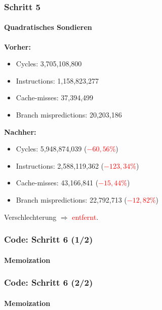 \documentclass{beamer}
\newcommand{\fail}[1]{\textcolor{red}{#1}}
\begin{document}
  \begin{frame}
  	\frametitle{Schritt 5}
  	\framesubtitle{Quadratisches Sondieren}
  	\textbf{Vorher:}
		\begin{itemize}
			\item Cycles: 3,705,108,800 \\
			\item Instructions: 1,158,823,277\\
			\item Cache-misses: 37,394,499\\
			\item Branch mispredictions: 20,203,186\\
		\end{itemize}

		\textbf{Nachher:}
		\begin{itemize}
			\item Cycles: 5,948,874,039 (\fail{$- 60,56 \%$})\\
			\item Instructions: 2,588,119,362 (\fail{$- 123,34 \%$})\\
			\item Cache-misses: 43,166,841 (\fail{$- 15,44 \%$})\\
			\item Branch mispredictions: 22,792,713 (\fail{$- 12,82 \%$})\\
		\end{itemize}
		Verschlechterung $\Rightarrow$ \fail{entfernt}.
  \end{frame}

  \begin{frame}
  	\frametitle{Code: Schritt 6 (1/2)}
  	\framesubtitle{Memoization}
		\sMemo
  \end{frame}

  \begin{frame}
  	\frametitle{Code: Schritt 6 (2/2)}
  	\framesubtitle{Memoization}
  	\sMemoMain
  \end{frame}
\end{document}
